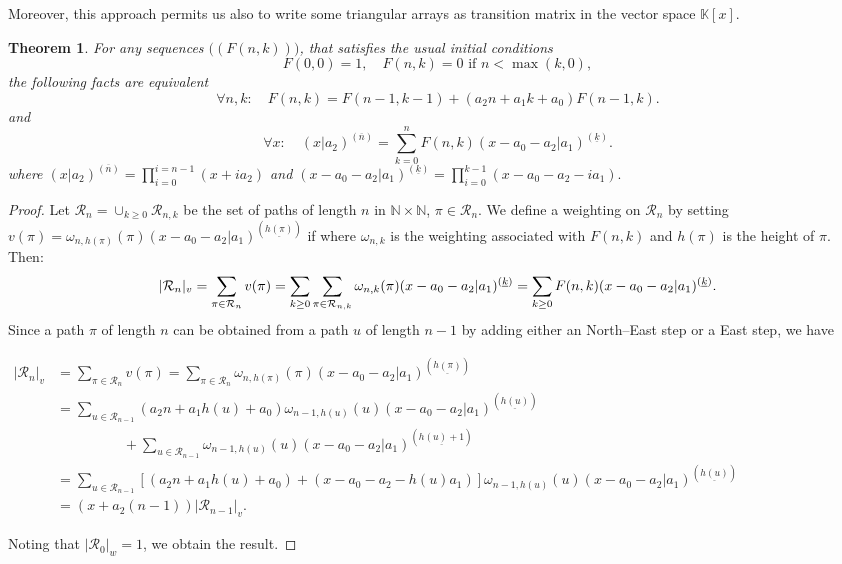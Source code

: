 \documentclass[12pt,a4paper]{article}
\newtheorem{theorem}{Theorem}[section]
\theoremstyle{definition} %
\theoremstyle{remark}
\theoremstyle{examples}
\newenvironment{porofo}[1][Proof]{%
	\begin{proof}[#1]%
	}{%
	\end{proof}%
}
\newcommand{\suit}[1]{{#1}(n,k)}
\newcommand{\argtgen}[3]{(#1|#2)^{(\overline{#3})}}
\newcommand{\argtgenm}[3]{(#1|#2)^{(\underline{#3})}}
\newcommand{\st}[2]{\mathcal{#1}_{#2}}
\begin{document}
Moreover, this approach permits us also to write some triangular arrays as transition matrix in the vector space $\mathbb{K}[x]$.
\begin{theorem}\label{theopass}
	\label{key}
	For any sequences $\big((F(n,k))\big)$, that satisfies the usual initial conditions
	\begin{equation*}
	F(0,0)=1, \quad \suit{F}=0 \text{ if } n<\max(k,0),
	\end{equation*} the following facts are equivalent
	\begin{equation}\label{bbbcas}
	\forall n,k: \quad		F(n,k) = F(n-1,k-1) + (a_2n+a_1k+a_0) F(n-1,k).
	\end{equation}
	and
	\begin{equation}\label{equabase1}
	\forall x: \quad 	\argtgen{x}{a_2}{n}= \sum_{k=0}^n \suit{F} \argtgenm{x-a_0-a_2}{a_1}{k}.
	\end{equation}
	where $ \argtgen{x}{a_2}{n}=\prod_{i=0}^{i=n-1}(x+ia_2)$ and $\argtgenm{x-a_0-a_2}{a_1}{k}=\prod_{i=0}^{k-1}(x-a_0-a_2-ia_1).$
\end{theorem}
\begin{porofo}
	Let $\st{R}{n}=\cup_{k\geq 0}\mathcal{R}_{n,k}$ be the set of paths of length $n$ in $\mathbb{N}\times \mathbb{N}$,  $\pi \in \st{R}{n}$. We define a  weighting on $\st{R}{n}$ by setting  $v(\pi)=\omega_{n,h(\pi)}(\pi)\argtgenm{x-a_0-a_2}{a_1}{h(\pi)}$ if where $\omega_{n,k}$ is the weighting associated with $F(n,k)$ and $h(\pi)$ is the height of $\pi$.  Then:
	\begin{equation}
	|\st{R}{n}|_v=\sum_{\pi\in \st{R}{n}}v(\pi)= \sum_{k\geq 0} \sum_{\pi\in \st{R}{n,k}}\omega_{n,k}(\pi)\argtgenm{x-a_0-a_2}{a_1}{k}=\sum_{k\geq 0} \suit{F} \argtgenm{x-a_0-a_2}{a_1}{k}. \notag
	\end{equation}
	Since a path $\pi$ of length $n$ can be obtained from a path $u$ of length $n-1$ by adding either an North–East step or a East step, we have
	
	\noindent	$\begin{array}{ll}|\mathcal{R}_n|_v&=\displaystyle\sum_{\pi\in\mathcal{R}_n}v(\pi)=\sum_{\pi\in\mathcal{R}_n}\omega_{n,h(\pi)}(\pi)(x-a_0-a_2|a_1)^{(\underline{h(\pi)})}\\ &\displaystyle =\sum_{u\in\mathcal{R}_{n-1}}(a_2n+a_1h(u)+a_0)\omega_{n-1,h(u)}(u)(x-a_0-a_2|a_1)^{(\underline{h(u)})}\\& \hspace{2cm} \displaystyle+\sum_{u\in\mathcal{R}_{n-1}}\omega_{n-1,h(u)}(u)(x-a_0-a_2|a_1)^{(\underline{h(u)+1})}\\
	& =\displaystyle	\sum_{u\in\mathcal{R}_{n-1}}[(a_2n+a_1h(u)+a_0)+(x-a_0-a_2-h(u)a_1)]\omega_{n-1,h(u)}(u)(x-a_0-a_2|a_1)^{(\underline{h(u)})}\\
	&=(x+a_2(n-1))|\mathcal{R}_{n-1}|_v.
	\end{array}$
	
	
	Noting that $|\st{R}{0}|_w=1$, we obtain the result.
	
	
\end{porofo}
\end{document}
